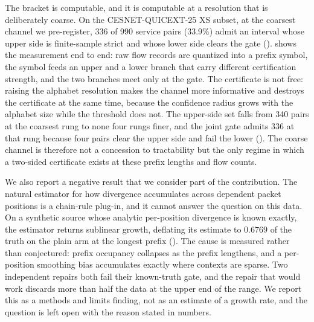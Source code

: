 The bracket is computable, and it is computable at a resolution that is
deliberately coarse. On the CESNET-QUICEXT-25 XS subset, at the coarsest channel
we pre-register, 336 of 990 service pairs (33.9\%) admit an interval whose upper
side is finite-sample strict and whose lower side clears the gate
().  shows the measurement end to end: raw
flow records are quantized into a prefix symbol, the symbol feeds an upper and a
lower branch that carry different certification strength, and the two branches
meet only at the gate. The certificate is not free: raising the alphabet
resolution makes the channel more informative and destroys the certificate at
the same time, because the confidence radius grows with the alphabet size while
the threshold does not. The upper-side set falls from 340 pairs at the coarsest rung
to none four rungs finer, and the joint gate admits 336 at that rung because four
pairs clear the upper side and fail the lower (). The coarse
channel is therefore not a concession to tractability but the only regime in
which a two-sided certificate exists at these prefix lengths and flow counts.

We also report a negative result that we consider part of the contribution. The
natural estimator for how divergence accumulates across dependent packet
positions is a chain-rule plug-in, and it cannot answer the question on this
data. On a synthetic source whose analytic per-position divergence is known
exactly, the estimator returns sublinear growth, deflating its estimate to
$0.6769$ of the truth on the plain arm at the longest prefix
(). The cause is measured rather than conjectured: prefix
occupancy collapses as the prefix lengthens, and a per-position smoothing bias
accumulates exactly where contexts are sparse. Two independent repairs both fail
their known-truth gate, and the repair that would work discards more than half
the data at the upper end of the range. We report this as a methods and limits
finding, not as an estimate of a growth rate, and the question is left open with
the reason stated in numbers.


